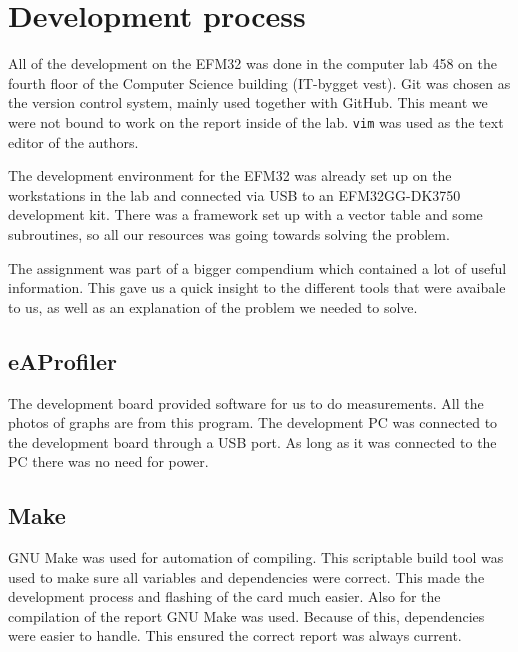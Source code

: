 \section{Development process}
All of the development on the EFM32 was done in the computer lab 458 on the fourth floor of the Computer Science building (IT-bygget vest). Git was chosen as the version control system, mainly used together with GitHub. This meant we were not bound to work on the report inside of the lab. \texttt{vim} was used as the text editor of the authors.

The development environment for the EFM32 was already set up on the workstations in the lab and connected via USB to an EFM32GG-DK3750 development kit. There was a framework set up with a vector table and some subroutines, so all our resources was going towards solving the problem.

The assignment was part of a bigger compendium \cite{eeds-compendium} which contained a lot of useful information. This gave us a quick insight to the different tools that were avaibale to us, as well as an explanation of the problem we needed to solve.

\subsection{eAProfiler}
The development board provided software for us to do measurements. All the photos of graphs are from this program. The development PC was connected to the development board through a USB port. As long as it was connected to the PC there was no need for power.

\subsection{Make}
GNU Make was used for automation of compiling. This scriptable build tool was used to make sure all variables and dependencies were correct. This made the development process and flashing of the card much easier. Also for the compilation of the report GNU Make was used. Because of this, dependencies were easier to handle. This ensured the correct report was always current.
